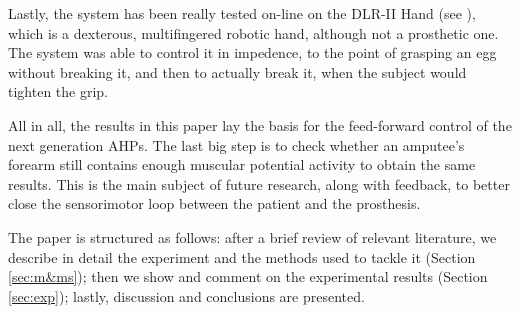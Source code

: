 Lastly, the system has been really tested on-line on the DLR-II Hand
(see \cite{ButFisGre2004}), which is a dexterous, multifingered
robotic hand, although not a prosthetic one. The system was able to
control it in impedence, to the point of grasping an egg without
breaking it, and then to actually break it, when the subject would
tighten the grip.

All in all, the results in this paper lay the basis for the
feed-forward control of the next generation AHPs. The last big step is
to check whether an amputee's forearm still contains enough muscular
potential activity to obtain the same results. This is the main
subject of future research, along with feedback, to better close the
sensorimotor loop between the patient and the prosthesis.

The paper is structured as follows: after a brief review of relevant
literature, we describe in detail the experiment and the methods used
to tackle it (Section \ref{sec:m&ms}); then we show and comment on the
experimental results (Section \ref{sec:exp}); lastly, discussion and
conclusions are presented.
